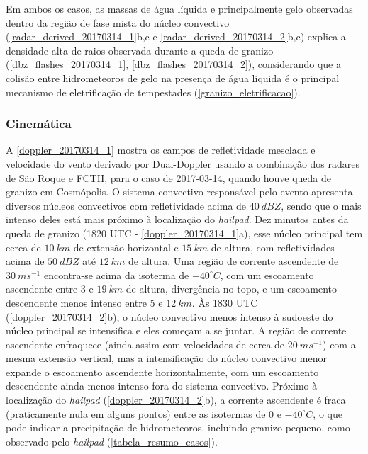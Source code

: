 Em ambos os casos, as massas de água líquida e principalmente gelo observadas dentro da região de fase mista do núcleo convectivo (\autoref{radar_derived_20170314_1}b,c e \autoref{radar_derived_20170314_2}b,c) explica a densidade alta de raios observada durante a queda de granizo (\autoref{dbz_flashes_20170314_1}, \autoref{dbz_flashes_20170314_2}), considerando que a colisão entre hidrometeoros de gelo na presença de água líquida é o principal mecanismo de eletrificação de tempestades (\autoref{granizo_eletrificacao}).

\subsubsection{Cinemática}\label{cinematica_201703014}

A \autoref{doppler_20170314_1} mostra os campos de refletividade mesclada e velocidade do vento derivado por Dual-Doppler usando a combinação dos radares de São Roque e FCTH, para o caso de 2017-03-14, quando houve queda de granizo em Cosmópolis. O sistema convectivo responsável pelo evento apresenta diversos núcleos convectivos com refletividade acima de $40\:dBZ$, sendo que o mais intenso deles está mais próximo à localização do \textit{hailpad}. Dez minutos antes da queda de granizo (1820 UTC - \autoref{doppler_20170314_1}a), esse núcleo principal tem cerca de $10\:km$ de extensão horizontal e $15\:km$ de altura, com refletividades acima de $50\:dBZ$ até $12\:km$ de altura. Uma região de corrente ascendente de $30\:ms^{-1}$ encontra-se acima da isoterma de $-40^{\circ}C$, com um escoamento ascendente entre 3 e $19\:km$ de altura, divergência no topo, e um escoamento descendente menos intenso entre 5 e $12\:km$. Às 1830 UTC (\autoref{doppler_20170314_2}b), o núcleo convectivo menos intenso à sudoeste do núcleo principal se intensifica e eles começam a se juntar. A região de corrente ascendente enfraquece (ainda assim com velocidades de cerca de $20\:ms^{-1}$) com a mesma extensão vertical, mas a intensificação do núcleo convectivo menor expande o escoamento ascendente horizontalmente, com um escoamento descendente ainda menos intenso fora do sistema convectivo. Próximo à localização do \textit{hailpad} (\autoref{doppler_20170314_2}b), a corrente ascendente é fraca (praticamente nula em alguns pontos) entre as isotermas de 0 e $-40^{\circ}C$, o que pode indicar a precipitação de hidrometeoros, incluindo granizo pequeno, como observado pelo \textit{hailpad} (\autoref{tabela_resumo_casos}).

